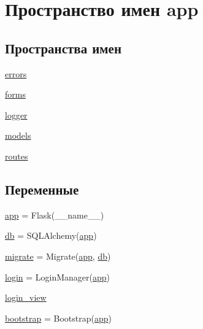\hypertarget{namespaceapp}{}\section{Пространство имен app}
\label{namespaceapp}
\subsection*{Пространства имен}
\begin{DoxyCompactItemize}
\item 
 \mbox{\hyperlink{namespaceapp_1_1errors}{errors}}
\item 
 \mbox{\hyperlink{namespaceapp_1_1forms}{forms}}
\item 
 \mbox{\hyperlink{namespaceapp_1_1logger}{logger}}
\item 
 \mbox{\hyperlink{namespaceapp_1_1models}{models}}
\item 
 \mbox{\hyperlink{namespaceapp_1_1routes}{routes}}
\end{DoxyCompactItemize}
\subsection*{Переменные}
\begin{DoxyCompactItemize}
\item 
\mbox{\hyperlink{namespaceapp_a675b4ea702c13dc4b8c05f985a25b496}{app}} = Flask(\+\_\+\+\_\+name\+\_\+\+\_\+)
\item 
\mbox{\hyperlink{namespaceapp_a75341a4bc0e8e239f299316136af3466}{db}} = S\+Q\+L\+Alchemy(\mbox{\hyperlink{namespaceapp_a675b4ea702c13dc4b8c05f985a25b496}{app}})
\item 
\mbox{\hyperlink{namespaceapp_a15a40303715f32fc22108c84baaeb68d}{migrate}} = Migrate(\mbox{\hyperlink{namespaceapp_a675b4ea702c13dc4b8c05f985a25b496}{app}}, \mbox{\hyperlink{namespaceapp_a75341a4bc0e8e239f299316136af3466}{db}})
\item 
\mbox{\hyperlink{namespaceapp_ab9cb25b758b83ccf851448416d009420}{login}} = Login\+Manager(\mbox{\hyperlink{namespaceapp_a675b4ea702c13dc4b8c05f985a25b496}{app}})
\item 
\mbox{\hyperlink{namespaceapp_a0cbb607dd84c52fec23f2a56b7151163}{login\+\_\+view}}
\item 
\mbox{\hyperlink{namespaceapp_ab0100f0fe587f9be45118e0ab4c7dc32}{bootstrap}} = Bootstrap(\mbox{\hyperlink{namespaceapp_a675b4ea702c13dc4b8c05f985a25b496}{app}})
\end{DoxyCompactItemize}



